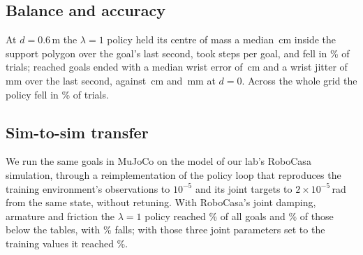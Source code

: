\subsection{Balance and accuracy}
\label{sec:balance}

At $d = 0.6$\,m the $\lambda = 1$ policy held its centre of mass a median \,cm inside the
support polygon over the goal's last second, took  steps per goal, and
fell in \% of trials; reached goals ended with a median wrist error of
\,cm and a wrist jitter of \,mm over the last
second, against \,cm and \,mm at $d = 0$.
Across the whole grid the policy fell in \% of trials.

\subsection{Sim-to-sim transfer}
\label{sec:sim2sim}

We run the same goals in MuJoCo on the model of our lab's RoboCasa simulation, through a reimplementation of the
policy loop that reproduces the training environment's observations to $10^{-5}$ and its joint targets to
$2\times10^{-5}$\,rad from the same state, without retuning. With
RoboCasa's joint damping, armature and friction the $\lambda = 1$ policy reached \%
of all goals and \% of those below the tables, with
\% falls; with those three joint parameters set to the training values it reached
\%. %

